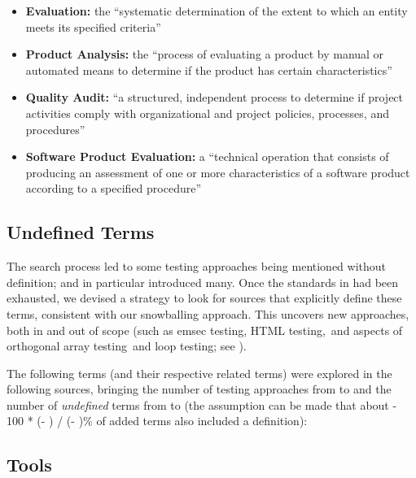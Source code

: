     \begin{itemize}
        \item \textbf{Evaluation:} the ``systematic determination of the extent
              to which an entity meets its specified criteria''
              \citep[p.~167]{IEEE2017}
        \item \textbf{Product Analysis:} the ``process of evaluating a product by
              manual or automated means to determine if the product has certain
              characteristics'' \citep[p.~343]{IEEE2017}
        \item \textbf{Quality Audit:} ``a structured, independent process to
              determine if project activities comply with organizational and
              project policies, processes, and procedures'' \citep[p.~361]{IEEE2017}
        \item \textbf{Software Product Evaluation:} a ``technical operation that
              consists of producing an assessment of one or more characteristics
              of a software product according to a specified procedure''
              \citep[p.~424]{IEEE2017}
    \end{itemize}
\fi
\subsection{Undefined Terms}
\label{undef-terms}

The search process led to some testing approaches being
mentioned without definition;
\citep{IEEE2022} and \citep{Firesmith2015} in particular introduced many.
Once the standards in  had been exhausted, we devised a strategy to
look for sources that explicitly define these terms, consistent with
our snowballing approach. This uncovers new approaches, both in and out of
scope (such as \acf{emsec} testing\ifnotpaper, HTML testing,\fi\ and aspects
of orthogonal array testing\ifnotpaper\ and loop testing\fi; see ).

The following terms (and their respective related terms) were explored
in the following sources, bringing the number of testing
approaches from \the\TotalBefore{} to \the\TotalAfter{} and the number of
\emph{undefined} terms from \the\UndefBefore{} to \the\UndefAfter{} (the
assumption can be made that about \the{} - 100 * (\UndefAfter -
\UndefBefore) / (\TotalAfter - \TotalBefore)\relax\% of added terms also
included a definition):



\ifnotpaper\else
    \subsection{Tools}  %
    \label{tools}
    \graphGenDesc{}
    \discrepClssTable{}
    \discrepCatsTable{}
\fi

